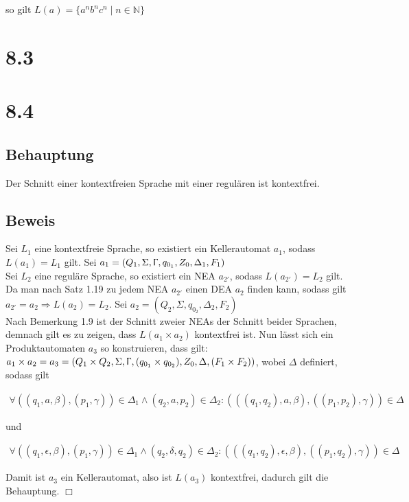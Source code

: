 \documentclass[12pt, a4paper]{article}
\begin{document}
so gilt $L(a) = \{a^n b^n c^n \mid n \in \mathbb{N} \}$
\section*{8.3}
\section*{8.4}
\subsection*{Behauptung}
Der Schnitt einer kontextfreien Sprache mit einer regulären ist kontextfrei.
\subsection*{Beweis}
Sei $L_1$ eine kontextfreie Sprache, so existiert ein Kellerautomat $a_1$, sodass $L(a_1) = L_1$ gilt. Sei $a_1 = (Q_1, \Sigma, \Upgamma, q_{0_1}, Z_0, \Delta_1, F_1)$ \\
Sei $L_2$ eine reguläre Sprache, so existiert ein NEA  $a_{2'}$, sodass $L(a_{2'}) = L_2$ gilt. 
Da man nach Satz 1.19 zu jedem NEA  $a_{2'}$ einen DEA $a_2$ finden kann, sodass gilt $a_{2'} = a_2 \Rightarrow L(a_2) = L_2$. Sei $a_2 = (Q_2, \Sigma, q_{0_2}, \Delta_2, F_2)$ \\
Nach Bemerkung 1.9 ist der Schnitt zweier NEAs der Schnitt beider Sprachen, demnach gilt es zu zeigen, dass $L(a_1 \times a_2)$ kontextfrei ist. 
Nun lässt sich ein Produktautomaten $a_3$ so konstruieren, dass gilt: $a_1 \times a_2 = a_3 = (Q_1 \times Q_2, \Sigma, \Upgamma, (q_{0_1} \times q_{0_2}), Z_0, \Delta, (F_1 \times F_2))$, wobei $\Delta$ definiert, sodass gilt

\begin{align*}
\forall ((q_1, a, \beta), (p_1, \gamma)) \in \Delta_1 \wedge (q_2, a, p_2) \in \Delta_2: (((q_1, q_2), a, \beta), ((p_1, p_2), \gamma)) \in \Delta
\end{align*}

und

\begin{align*}
\forall ((q_1, \epsilon, \beta), (p_1, \gamma)) \in \Delta_1 \wedge (q_2, \delta, q_2) \in \Delta_2: (((q_1, q_2), \epsilon, \beta), ((p_1, q_2), \gamma)) \in \Delta
\end{align*}

Damit ist $a_3$ ein Kellerautomat, also ist $L(a_3)$ kontextfrei, dadurch gilt die Behauptung.
\hfill $\Box$\\
\end{document}

